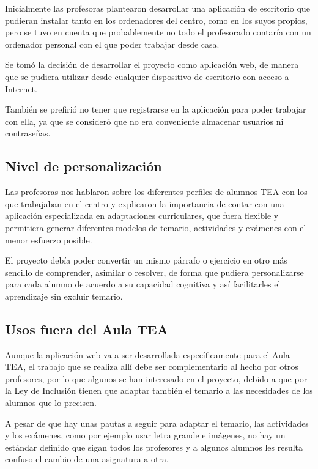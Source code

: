     Inicialmente las profesoras plantearon desarrollar una aplicaci\'on de escritorio que pudieran instalar tanto en los ordenadores del centro, como en los suyos propios, pero se tuvo en cuenta que probablemente no todo el profesorado contar\'ia con un ordenador personal con el que poder trabajar desde casa.

    Se tom\'o la decisi\'on de desarrollar el proyecto como aplicaci\'on web, de manera que se pudiera utilizar desde cualquier dispositivo de escritorio con acceso a Internet.

    Tambi\'en se prefiri\'o no tener que registrarse en la aplicaci\'on para poder trabajar con ella, ya que se consider\'o que no era conveniente almacenar usuarios ni contrase\~{n}as.

\subsection{Nivel de personalizaci\'on}

    Las profesoras nos hablaron sobre los diferentes perfiles de alumnos TEA con los que trabajaban en el centro y explicaron la importancia de contar con una aplicaci\'on especializada en adaptaciones curriculares, que fuera flexible y permitiera generar diferentes modelos de temario, actividades y ex\'amenes con el menor esfuerzo posible.

    El proyecto deb\'ia poder convertir un mismo p\'arrafo o ejercicio en otro m\'as sencillo de comprender, asimilar o resolver, de forma que pudiera personalizarse para cada alumno de acuerdo a su capacidad cognitiva y as\'i facilitarles el aprendizaje sin excluir temario.

\subsection{Usos fuera del Aula TEA}

    Aunque la aplicaci\'on web va a ser desarrollada espec\'ificamente para el Aula TEA, el trabajo que se realiza all\'i debe ser complementario al hecho por otros profesores, por lo que algunos se han interesado en el proyecto, debido a que por la Ley de Inclusi\'on tienen que adaptar tambi\'en el temario a las necesidades de los alumnos que lo precisen.

    A pesar de que hay unas pautas a seguir para adaptar el temario, las actividades y los ex\'amenes, como por ejemplo usar letra grande e im\'agenes, no hay un est\'andar definido que sigan todos los profesores y a algunos alumnos les resulta confuso el cambio de una asignatura a otra.

